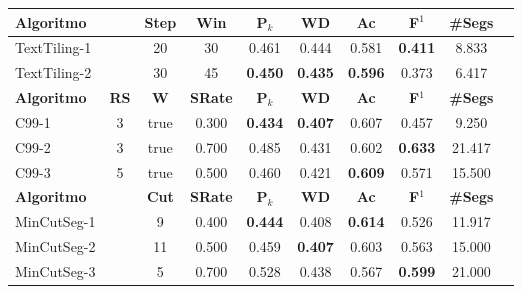 
\begin{table}[!h]
\tiny
	\centering
	\begin{tabular}{|l||c|c|c|c|c|c|c|c|c|} \hline

		\textbf{Algoritmo} && 
		\textbf{Step} &
		\textbf{Win} & 
		\textbf{P$_k$} & 
		\textbf{WD} & 
		\textbf{Ac} & 
		\textbf{F$^1$} &
		\textbf{\#Segs} \\	\hline

TextTiling-1 && 20 & 30 & 0.461 & 0.444 & 0.581 
		   & \cellcolor{gray!20} \textbf{0.411} & 8.833  \\ \hline 
TextTiling-2 && 30 & 45 & \cellcolor{gray!20} \textbf{0.450} & \cellcolor{gray!20} \textbf{0.435} & \cellcolor{gray!20} \textbf{0.596} 
		   & 0.373 & 6.417  \\ \hline 

\hline
		\textbf{Algoritmo} &
		\textbf{RS} &
		\textbf{W} & 
		\textbf{SRate}& 
		\textbf{P$_k$} & 
		\textbf{WD} & 
		\textbf{Ac} & 
		\textbf{F$^1$} &
		\textbf{\#Segs} \\	\hline

C99-1 & 3 & true  &0.300 &  \cellcolor{gray!20} \textbf{0.434} & \cellcolor{gray!20} \textbf{0.407} & 0.607 
	& 0.457 & 9.250  \\ \hline 
C99-2 & 3 & true  &0.700 &  0.485 & 0.431 & 0.602 
	& \cellcolor{gray!20} \textbf{0.633} & 21.417  \\ \hline 
C99-3 & 5 & true  &0.500 &  0.460 & 0.421 & \cellcolor{gray!20} \textbf{0.609} 
	& 0.571 & 15.500  \\ \hline 


\hline
		\textbf{Algoritmo} && 
		\textbf{Cut} & 
		\textbf{SRate} &
		\textbf{P$_k$} & 
		\textbf{WD} & 
		\textbf{Ac} & 
		\textbf{F$^1$} &
		\textbf{\#Segs} \\	\hline


MinCutSeg-1 && 9  & 0.400 & \cellcolor{gray!20} \textbf{0.444} & 0.408 & \cellcolor{gray!20} \textbf{0.614} 
		  & 0.526 & 11.917  \\ \hline 
MinCutSeg-2 && 11 & 0.500 & 0.459 & \cellcolor{gray!20} \textbf{0.407} & 0.603 
		  & 0.563 & 15.000  \\ \hline 
MinCutSeg-3 && 5  & 0.700 & 0.528 & 0.438 & 0.567 
		  & \cellcolor{gray!20} \textbf{0.599} & 21.000  \\ \hline 



\end{tabular}
\end{table}
